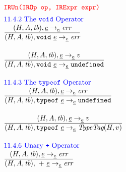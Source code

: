 \[
\begin{array}{l@{~~}l@{~~}ll}
\mtt{\normalsize\inred IRUn(IROp op, IRExpr expr)}\\[.5em]
\mbox{\inblue 11.4.2 The {\tt void} Operator}\\

\frac{\begin{matrix}
\evale, \irexpr \rightarrow_{\ir\expr} \err
\end{matrix}}{\begin{matrix}
\state, {\tt void}\ \irexpr
\rightarrow_{\ir\expr}
\err
\end{matrix}}
\\[2em]

\frac{\begin{matrix}
\evale, \irexpr \rightarrow_{\ir\expr} v
\end{matrix}}{\begin{matrix}
\state, {\tt void}\ \irexpr
\rightarrow_{\ir\expr}
\undef
\end{matrix}}
\\[2em]


\mbox{\inblue 11.4.3 The {\tt typeof} Operator}\\

\frac{\begin{matrix}
\evale, \irexpr \rightarrow_{\ir\expr} \err
\end{matrix}}{\begin{matrix}
\state, {\tt typeof}\ \irexpr
\rightarrow_{\ir\expr}
\undef
\end{matrix}}
\\[2em]

\frac{\begin{matrix}
\evale, \irexpr \rightarrow_{\ir\expr} v
\end{matrix}}{\begin{matrix}
\state, {\tt typeof}\ \irexpr
\rightarrow_{\ir\expr}
\hf{TypeTag}(H,v)
\end{matrix}}
\\[2em]

\mbox{\inblue 11.4.6 Unary {\tt +} Operator}\\
\frac{\begin{matrix}
\evale, \irexpr \rightarrow_{\ir\expr} \err
\end{matrix}}{\begin{matrix}
\state, \ {\tt +}\ \irexpr
\rightarrow_{\ir\expr}
\err
\end{matrix}}
\\[2em]


\end{array}\]
